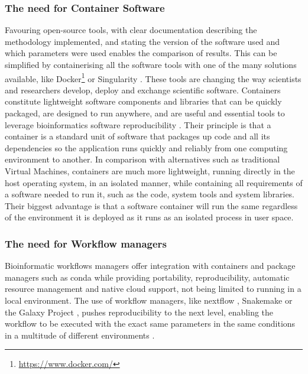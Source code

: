 

\subsubsection{The need for Container Software} 

Favouring open-source tools, with clear documentation describing the methodology implemented, and stating the version of the software used and which parameters were used enables the comparison of results. This can be simplified by containerising all the software tools with one of the many solutions available, like Docker\footnote{\url{https://www.docker.com/}} or Singularity \citep{kurtzer_singularity_2017}. These tools are changing the way scientists and researchers develop, deploy and exchange scientific software. Containers constitute lightweight software components and
libraries that can be quickly packaged, are designed to run anywhere, and are useful and essential tools to leverage bioinformatics software reproducibility \citep{boettiger_introduction_2015,gruening_recommendations_2019}. Their principle is that a container is a standard unit of software that packages up code and all its dependencies so the application runs quickly and reliably from one computing environment to another. In comparison with alternatives such as traditional Virtual Machines, containers are much more lightweight, running directly in the host operating system, in an isolated manner, while containing all requirements of a software needed to run it, such as the code, system tools and system libraries. Their biggest advantage is that a software container will run the same regardless of the environment it is deployed as it runs as an isolated process in user space. 

\subsubsection{The need for Workflow managers}

Bioinformatic workflows managers offer integration with containers and package managers such as conda while providing portability, reproducibility, automatic resource management and native cloud support, not being limited to running in a local environment. 
The use of workflow managers, like nextflow \citep{di_tommaso_nextflow_2017}, Snakemake or the Galaxy Project \citep{afgan_galaxy_2018}, pushes reproducibility to the next level, enabling the workflow to be executed with the exact same parameters in the same conditions in a multitude of different environments \citep{wratten_reproducible_2021}. 

